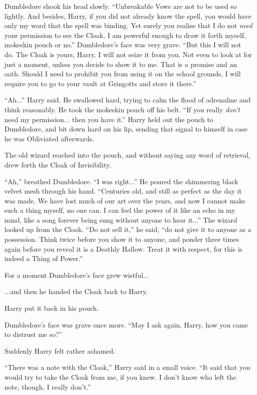 Dumbledore shook his head slowly. ``Unbreakable Vows are not to be used so lightly. And besides, Harry, if you did not already know the spell, you would have only my word that the spell was binding. Yet surely you realise that I do not \emph{need} your permission to see the Cloak. I am powerful enough to draw it forth myself, mokeskin pouch or no.'' Dumbledore's face was very grave. ``But this I will not do. The Cloak is yours, Harry. I will not seize it from you. Not even to look at for just a moment, unless you decide to show it to me. That is a promise and an oath. Should I need to prohibit you from using it on the school grounds, I will require you to go to your vault at Gringotts and store it there.''

``Ah...'' Harry said. He swallowed hard, trying to calm the flood of adrenaline and think reasonably. He took the mokeskin pouch off his belt. ``If you really \emph{don't} need my permission... then you have it.'' Harry held out the pouch to Dumbledore, and bit down hard on his lip, sending that signal to himself in case he was Obliviated afterwards.

The old wizard reached into the pouch, and without saying any word of retrieval, drew forth the Cloak of Invisibility.

``Ah,'' breathed Dumbledore. ``I was right...'' He poured the shimmering black velvet mesh through his hand. ``Centuries old, and still as perfect as the day it was made. We have lost much of our art over the years, and now I cannot make such a thing myself, no one can. I can feel the power of it like an echo in my mind, like a song forever being sung without anyone to hear it...'' The wizard looked up from the Cloak. ``Do not sell it,'' he said, ``do not give it to anyone as a possession. Think twice before you show it to anyone, and ponder three times again before you reveal it is a Deathly Hallow. Treat it with respect, for this is indeed a Thing of Power.''

For a moment Dumbledore's face grew wistful...

...and then he handed the Cloak back to Harry.

Harry put it back in his pouch.

Dumbledore's face was grave once more. ``May I ask again, Harry, how you came to distrust me so?''

Suddenly Harry felt rather ashamed.

``There was a note with the Cloak,'' Harry said in a small voice. ``It said that you would try to take the Cloak from me, if you knew. I don't know who left the note, though, I really don't.''

